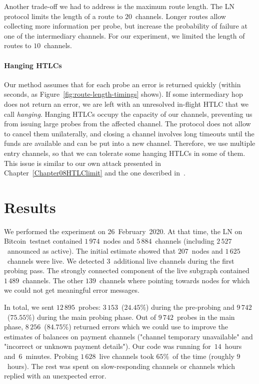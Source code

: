 Another trade-off we had to address is the maximum route length.
The LN protocol limits the length of a route to $20$~channels.
Longer routes allow collecting more information per probe, but increase the probability of failure at one of the intermediary channels.
For our experiment, we limited the length of routes to $10$~channels.

\paragraph{Hanging HTLCs}
Our method assumes that for each probe an error is returned quickly (within seconds, as Figure~\ref{fig:route-length-timings} shows).
If some intermediary hop does not return an error, we are left with an unresolved in-flight HTLC that we call \textit{hanging}.
Hanging HTLCs occupy the capacity of our channels, preventing us from issuing large probes from the affected channel.
The protocol does not allow to cancel them unilaterally, and closing a channel involves long timeouts until the funds are available and can be put into a new channel.
Therefore, we use multiple entry channels, so that we can tolerate some hanging HTLCs in some of them.
This issue is similar to our own attack presented in Chapter~\ref{Chapter08HTLClimit} and the one described in~\cite{Mizrahi2020}.


\section{Results} \label{sec:results}

We performed the experiment on 26~February~2020.
At that time, the LN on Bitcoin~testnet contained $1\,974$~nodes and $5\,884$~channels (including $2\,527$~announced as active).
The initial estimate showed that $207$~nodes and $1\,625$~channels were live.
We detected $3$~additional live channels during the first probing pass.
The strongly connected component of the live subgraph contained $1\,489$~channels.
The other $139$~channels where pointing towards nodes for which we could not get meaningful error messages.

In total, we sent $12\,895$~probes: $3\,153$~($24.45\%$) during the pre-probing and $9\,742$~($75.55\%$) during the main probing phase.
Out of $9\,742$~probes in the main phase, $8\,256$~($84.75\%$) returned errors which we could use to improve the estimates of balances on payment channels ("channel temporary unavailable" and "incorrect or unknown payment details").
Our code was running for~$14$~hours and~$6$~minutes. %
Probing $1\,628$~live channels took $65\%$~of the time (roughly $9$~hours).
The rest was spent on slow-responding channels or channels which replied with an unexpected error.


